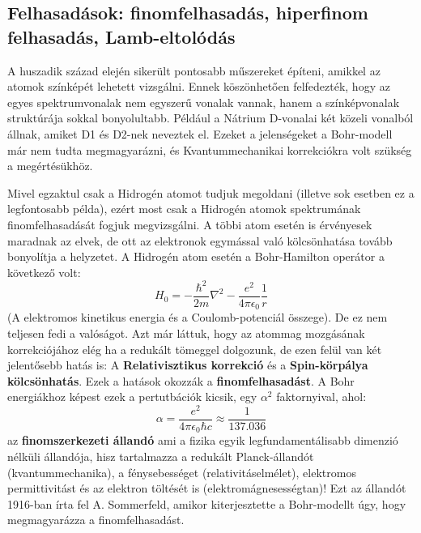\documentclass[../main.tex]{subfiles}
\begin{document}
\subsection{Felhasadások: finomfelhasadás, hiperfinom felhasadás, Lamb-eltolódás}
A huszadik század elején sikerült pontosabb műszereket építeni, amikkel az atomok színképét lehetett vizsgálni. Ennek köszönhetően felfedezték, hogy az egyes spektrumvonalak nem egyszerű vonalak vannak,
hanem a színképvonalak struktúrája sokkal bonyolultabb. Például a Nátrium D-vonalai két közeli vonalból állnak, amiket D1 és D2-nek neveztek el. Ezeket a jelenségeket a Bohr-modell már nem tudta megmagyarázni,
és Kvantummechanikai korrekciókra volt szükség a megértésükhöz.

Mivel egzaktul csak a Hidrogén atomot tudjuk megoldani (illetve sok esetben ez a legfontosabb példa), ezért most csak a Hidrogén atomok spektrumának finomfelhasadását fogjuk megvizsgálni. A többi atom esetén
is érvényesek maradnak az elvek, de ott az elektronok egymással való kölcsönhatása tovább bonyolítja a helyzetet. A Hidrogén atom esetén a Bohr-Hamilton operátor a következő volt:
\begin{equation}
    H_0 = - \frac{\hbar^2}{2m} \nabla^2 - \frac{e^2}{4 \pi \epsilon_0} \frac{1}{r}
\end{equation}
(A elektromos kinetikus energia és a Coulomb-potenciál összege). De ez nem teljesen fedi a valóságot. Azt már láttuk, hogy az atommag mozgásának korrekciójához elég ha a redukált tömeggel dolgozunk,
de ezen felül van két jelentősebb hatás is: A \textbf{Relativisztikus korrekció} és a \textbf{Spin-körpálya kölcsönhatás}. Ezek a hatások okozzák a \textbf{finomfelhasadást}.
A Bohr energiákhoz képest ezek a pertutbációk kicsik, egy $\alpha^2$ faktornyival, ahol:
\begin{equation}
    \alpha = \frac{e^2}{4 \pi \epsilon_0 \hbar c} \approx \frac{1}{137.036}
\end{equation}
az \textbf{finomszerkezeti állandó} ami a fizika egyik legfundamentálisabb dimenzió nélküli állandója, hisz tartalmazza a redukált Planck-állandót (kvantummechanika), a fénysebességet (relativitáselmélet), elektromos permittivitást és az elektron töltését is (elektromágnesességtan)!
Ezt az állandót 1916-ban írta fel A. Sommerfeld, amikor kiterjesztette a Bohr-modellt úgy, hogy megmagyarázza a finomfelhasadást.
\end{document}
